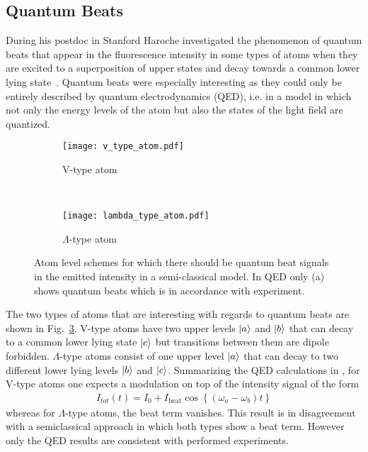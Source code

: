 \subsection{Quantum Beats}
\label{sec:QuantumBeats}
During his postdoc in Stanford Haroche investigated the phenomenon of quantum
beats that appear in the fluorescence intensity in some types of atoms when they
are excited to a superposition of upper states and decay towards a common lower
lying state~\cite{haroche1973hyperfine}. Quantum beats were especially interesting as they could only be
entirely described by quantum electrodynamics (QED), i.e. in a model in which
not only the energy levels of the atom but also the states of the light field
are quantized.


\begin{figure}[t]
  \centering
  \begin{subfigure}[t]{0.4\linewidth}
    \texttt{[image: v\_type\_atom.pdf]}
    \caption{V-type atom}
    \label{fig:V_type}
  \end{subfigure}
  ~
  \begin{subfigure}[t]{0.4\linewidth}
    \centering
    \texttt{[image: lambda\_type\_atom.pdf]}
    \caption{$\Lambda$-type atom}
    \label{fig:lam_type}
  \end{subfigure}
  \caption{Atom level schemes for which there should be quantum beat signals in the
    emitted intensity in a semi-classical model. In QED only (a) shows quantum
beats which is in accordance with experiment.}
  \label{fig:atom_types}
\end{figure}

The two types of atoms that are interesting with regards to quantum beats are
shown in Fig.~\ref{fig:atom_types}. V-type atoms have two upper levels $\ket{a}$
and $\ket{b}$ that can decay to a common lower lying state $\ket{c}$ but
transitions between them are dipole forbidden. $\Lambda$-type atoms consist of
one upper level $\ket{a}$ that can decay to two different lower lying levels
$\ket{b}$ and $\ket{c}$. Summarizing the QED calculations in
\cite{scully1997QuantumBeats}, for V-type atoms one expects a modulation on top
of the intensity signal of the form
\begin{align}
  \label{eq:quantum_beat}
  I_{tot}(t) = I_0 + I_{\text{beat}} \cos\left\lbrace \left(\omega_a -
  \omega_b\right) t\right\rbrace
\end{align}
whereas for $\Lambda$-type atoms, the beat term vanishes. This result is in
disagreement with a semiclassical approach in which both types show a beat term.
However only the QED results are consistent with performed experiments.

